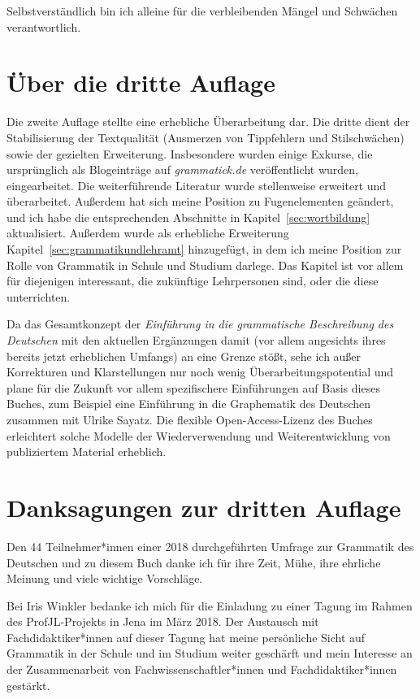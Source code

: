Selbstverständlich bin ich alleine für die verbleibenden Mängel und Schwächen verantwortlich.


\section*{Über die dritte Auflage}
\label{sec:ueberdiedritteauflage}

Die zweite Auflage stellte eine erhebliche Überarbeitung dar.
Die dritte dient der Stabilisierung der Textqualität (Ausmerzen von Tippfehlern und Stilschwächen) sowie der gezielten Erweiterung.
Insbesondere wurden einige Exkurse, die ursprünglich als Blogeinträge auf \textit{grammatick.de} veröffentlicht wurden, eingearbeitet.
Die weiterführende Literatur wurde stellenweise erweitert und überarbeitet.
Außerdem hat sich meine Position zu Fugenelementen geändert, und ich habe die entsprechenden Abschnitte in Kapitel~\ref{sec:wortbildung} aktualisiert.
Außerdem wurde als erhebliche Erweiterung Kapitel~\ref{sec:grammatikundlehramt} hinzugefügt, in dem ich meine Position zur Rolle von Grammatik in Schule und Studium darlege.
Das Kapitel ist vor allem für diejenigen interessant, die zukünftige Lehrpersonen sind, oder die diese unterrichten.

Da das Gesamtkonzept der \textit{Einführung in die grammatische Beschreibung des Deutschen} mit den aktuellen Ergänzungen damit (vor allem angesichts ihres bereits jetzt erheblichen Umfangs) an eine Grenze stößt, sehe ich außer Korrekturen und Klarstellungen nur noch wenig Überarbeitungspotential und plane für die Zukunft vor allem spezifischere Einführungen auf Basis dieses Buches, zum Beispiel eine Einführung in die Graphematik des Deutschen zusammen mit Ulrike Sayatz.
Die flexible Open-Access-Lizenz des Buches erleichtert solche Modelle der Wiederverwendung und Weiterentwicklung von publiziertem Material erheblich.

\section*{Danksagungen zur dritten Auflage}
\label{sec:danksagungenzurdrittenauflage}

Den 44 Teilnehmer*innen einer 2018 durchgeführten Umfrage zur Grammatik des Deutschen und zu diesem Buch danke ich für ihre Zeit, Mühe, ihre ehrliche Meinung und viele wichtige Vorschläge.

Bei Iris Winkler bedanke ich mich für die Einladung zu einer Tagung im Rahmen des ProfJL-Projekts in Jena im März 2018.
Der Austausch mit Fachdidaktiker*innen auf dieser Tagung hat meine persönliche Sicht auf Grammatik in der Schule und im Studium weiter geschärft und mein Interesse an der Zusammenarbeit von Fachwissenschaftler*innen und Fachdidaktiker*innen gestärkt.

